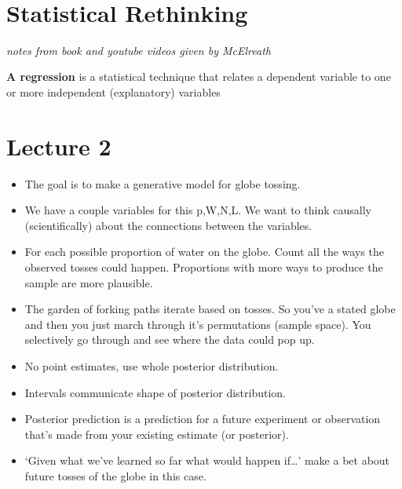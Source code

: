 \documentclass[11pt]{article}
\begin{document}
\thispagestyle{empty}
\bigskip \
\vspace{0.1cm}

\begin{center}
{\fontsize{36}{36} \selectfont \bf \sffamily }
\vskip 24pt
{\fontsize{18}{18} \selectfont \rmfamily } 
\vskip 24pt
\end{center}

{\parindent0pt \baselineskip=15.5pt \lipsum[1-4]}

\newpage
\microtoc
\newpage

\hypertarget{statistical-rethinking}{%
\section{Statistical Rethinking}\label{statistical-rethinking}}

\emph{notes from book and youtube videos given by McElreath}

\textbf{A regression} is a statistical technique that relates a
dependent variable to one or more independent (explanatory) variables

\hypertarget{lecture-2}{%
\section{Lecture 2}\label{lecture-2}}

\begin{itemize}
\tightlist
\item
  The goal is to make a generative model for globe tossing.
\item
  We have a couple variables for this p,W,N,L. We want to think causally
  (scientifically) about the connections between the variables.
\item
  For each possible proportion of water on the globe. Count all the ways
  the observed tosses could happen. Proportions with more ways to
  produce the sample are more plausible.
\item
  The garden of forking paths iterate based on tosses. So you've a
  stated globe and then you just march through it's permutations (sample
  space). You selectively go through and see where the data could pop
  up.
\item
  No point estimates, use whole posterior distribution.
\item
  Intervals communicate shape of posterior distribution.
\item
  Posterior prediction is a prediction for a future experiment or
  observation that's made from your existing estimate (or posterior).
\item
  `Given what we've learned so far what would happen if\ldots{}' make a
  bet about future tosses of the globe in this case.
\end{itemize}
\end{document}
